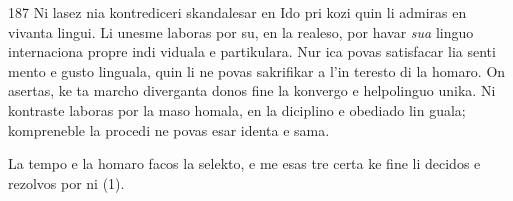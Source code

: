 \begin{VUpage}[191]{187}
Ni lasez nia kontrediceri skandalesar en Ido pri kozi quin\nl
li admiras en vivanta lingui. Li unesme laboras por su, en\nl
la realeso, por havar \textit{sua} linguo internaciona propre indi\cc
viduala e partikulara. Nur ica povas satisfacar lia senti\cc
mento e gusto linguala, quin li ne povas sakrifikar a l'in\cc
teresto di la homaro. On asertas, ke ta marcho diverganta\nl
donos fine la konvergo e helpolinguo unika. Ni kontraste\nl
laboras por la maso homala, en la diciplino e obediado lin\cc
guala; kompreneble la procedi ne povas esar identa e sama.\parplein

La tempo e la homaro facos la selekto, e me esas tre certa\nl
ke fine li decidos e rezolvos por ni (1).
\end{VUpage}

